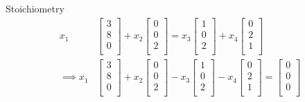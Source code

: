 \documentclass{beamer}
\begin{document}
\begin{frame}{Stoichiometry}
{\begin{align*}
x_1&\begin{bmatrix}
    \text{3} \\
    \text{8} \\
    \text{0} \\
\end{bmatrix} + x_2 \begin{bmatrix}
    \text{0} \\
    \text{0} \\
    \text{2} \\
\end{bmatrix}
=
x_3\begin{bmatrix}
    \text{1} \\
    \text{0} \\
    \text{2} \\
\end{bmatrix}
+ x_4\begin{bmatrix}
    \text{0} \\
    \text{2} \\
    \text{1} \\
\end{bmatrix} \\
\implies x_1&\begin{bmatrix}
    \text{3} \\
    \text{8} \\
    \text{0} \\
\end{bmatrix} + x_2 \begin{bmatrix}
    \text{0} \\
    \text{0} \\
    \text{2} \\
\end{bmatrix}
- x_3\begin{bmatrix}
    \text{1} \\
    \text{0} \\
    \text{2} \\
\end{bmatrix}
- x_4\begin{bmatrix}
    \text{0} \\
    \text{2} \\
    \text{1} \\
\end{bmatrix}
= \begin{bmatrix}
    \text{0} \\
    \text{0} \\
    \text{0} \\
\end{bmatrix} \\

\end{align*}}
\end{frame}
\end{document}
